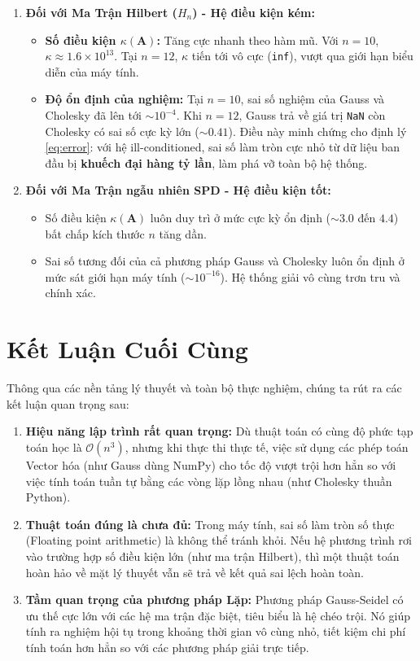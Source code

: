 \documentclass[a4paper,12pt]{report}
\begin{document}
\begin{enumerate}
    \item \textbf{Đối với Ma Trận Hilbert ($H_n$) - Hệ điều kiện kém:}
    \begin{itemize}
        \item \textbf{Số điều kiện $\kappa(\mathbf{A})$:} Tăng cực nhanh theo hàm mũ. Với $n=10$, $\kappa \approx 1.6 \times 10^{13}$. Tại $n=12$, $\kappa$ tiến tới vô cực (\texttt{inf}), vượt qua giới hạn biểu diễn của máy tính.
        \item \textbf{Độ ổn định của nghiệm:} Tại $n=10$, sai số nghiệm của Gauss và Cholesky đã lên tới $\sim 10^{-4}$. Khi $n=12$, Gauss trả về giá trị \texttt{NaN} còn Cholesky có sai số cực kỳ lớn ($\sim 0.41$). Điều này minh chứng cho định lý \ref{eq:error}: với hệ ill-conditioned, sai số làm tròn cực nhỏ từ dữ liệu ban đầu bị \textbf{khuếch đại hàng tỷ lần}, làm phá vỡ toàn bộ hệ thống.
    \end{itemize}

    \item \textbf{Đối với Ma Trận ngẫu nhiên SPD - Hệ điều kiện tốt:}
    \begin{itemize}
        \item Số điều kiện $\kappa(\mathbf{A})$ luôn duy trì ở mức cực kỳ ổn định ($\sim 3.0$ đến $4.4$) bất chấp kích thước $n$ tăng dần.
        \item Sai số tương đối của cả phương pháp Gauss và Cholesky luôn ổn định ở mức sát giới hạn máy tính ($\sim 10^{-16}$). Hệ thống giải vô cùng trơn tru và chính xác.
    \end{itemize}
\end{enumerate}

\section{Kết Luận Cuối Cùng}
Thông qua các nền tảng lý thuyết và toàn bộ thực nghiệm, chúng ta rút ra các kết luận quan trọng sau:
\begin{enumerate}
    \item \textbf{Hiệu năng lập trình rất quan trọng:} Dù thuật toán có cùng độ phức tạp toán học là $\mathcal{O}(n^3)$, nhưng khi thực thi thực tế, việc sử dụng các phép toán Vector hóa (như Gauss dùng NumPy) cho tốc độ vượt trội hơn hẳn so với việc tính toán tuần tự bằng các vòng lặp lồng nhau (như Cholesky thuần Python).
    \item \textbf{Thuật toán đúng là chưa đủ:} Trong máy tính, sai số làm tròn số thực (Floating point arithmetic) là không thể tránh khỏi. Nếu hệ phương trình rơi vào trường hợp số điều kiện lớn (như ma trận Hilbert), thì một thuật toán hoàn hảo về mặt lý thuyết vẫn sẽ trả về kết quả sai lệch hoàn toàn.
    \item \textbf{Tầm quan trọng của phương pháp Lặp:} Phương pháp Gauss-Seidel có ưu thế cực lớn với các hệ ma trận đặc biệt, tiêu biểu là hệ chéo trội. Nó giúp tính ra nghiệm hội tụ trong khoảng thời gian vô cùng nhỏ, tiết kiệm chi phí tính toán hơn hẳn so với các phương pháp giải trực tiếp.
\end{enumerate}
\end{document}
